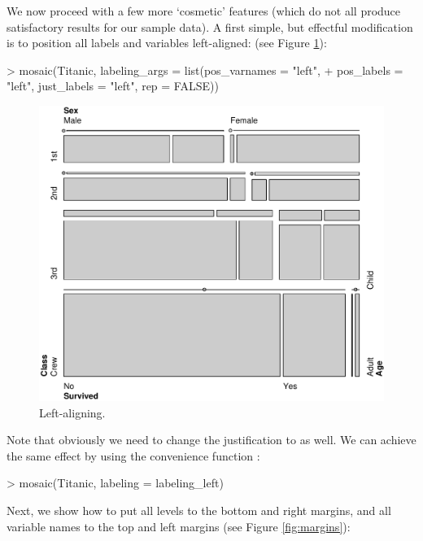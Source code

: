 \documentclass[a4paper]{article}
\newcommand{\codefun}[1]{\code{#1()}}
\begin{document}
We now proceed with a few more `cosmetic' features (which do not all
produce satisfactory results for our sample data).
A first simple, but effectful modification is to position
all labels and variables left-aligned:  (see Figure \ref{fig:left}):

\begin{Schunk}
\begin{Sinput}
> mosaic(Titanic, labeling_args = list(pos_varnames = "left", 
+     pos_labels = "left", just_labels = "left", rep = FALSE))
\end{Sinput}
\end{Schunk}

\begin{figure}[h]
\begin{center}
\includegraphics{labeling-leftfig}
\caption{Left-aligning.}
\label{fig:left}
\end{center}
\end{figure}

\noindent Note that obviously we need to change the justification 
to  as well. We can
achieve the same effect by using the convenience function \codefun{labeling\_left}: 

\begin{Schunk}
\begin{Sinput}
> mosaic(Titanic, labeling = labeling_left)
\end{Sinput}
\end{Schunk}

\noindent Next, we show how to put all levels to the
bottom and right margins, and all variable names to the top and left
margins (see Figure \ref{fig:margins}):
\end{document}
